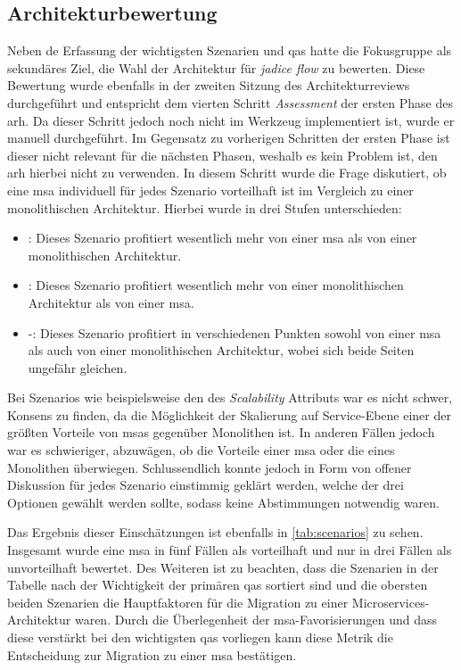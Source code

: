 \subsection{Architekturbewertung}

Neben de Erfassung der wichtigsten Szenarien und \glspl{qa} hatte die Fokusgruppe als sekundäres Ziel, die Wahl der Architektur für \emph{jadice flow} zu bewerten. 
Diese Bewertung wurde ebenfalls in der zweiten Sitzung des Architekturreviews durchgeführt und entspricht dem vierten Schritt \emph{Assessment} der ersten Phase des \gls{arh}.
Da dieser Schritt jedoch noch nicht im Werkzeug implementiert ist, wurde er manuell durchgeführt.
Im Gegensatz zu vorherigen Schritten der ersten Phase ist dieser nicht relevant für die nächsten Phasen, weshalb es kein Problem ist, den \gls{arh} hierbei nicht zu verwenden.
In diesem Schritt wurde die Frage diskutiert, ob eine \acrlong{msa} individuell für jedes Szenario vorteilhaft ist im Vergleich zu einer monolithischen Architektur.
Hierbei wurde in drei Stufen unterschieden:
\begin{itemize}
	\item \advantage\hspace*{0.1cm}: Dieses Szenario profitiert wesentlich mehr von einer \gls{msa} als von einer monolithischen Architektur.
	\item \disadvantage\hspace*{0.1cm}: Dieses Szenario profitiert wesentlich mehr von einer monolithischen Architektur als von einer \gls{msa}.
	\item \hspace*{0.27cm}-\hspace*{0.27cm}: Dieses Szenario profitiert in verschiedenen Punkten sowohl von einer \gls{msa} als auch von einer monolithischen Architektur, wobei sich beide Seiten ungefähr gleichen.
\end{itemize}
Bei Szenarios wie beispielsweise den des \emph{Scalability} Attributs war es nicht schwer, Konsens zu finden, da die Möglichkeit der Skalierung auf Service-Ebene einer der größten Vorteile von \glspl{msa} gegenüber Monolithen ist.
In anderen Fällen jedoch war es schwieriger, abzuwägen, ob die Vorteile einer \gls{msa} oder die eines Monolithen überwiegen.
Schlussendlich konnte jedoch in Form von offener  Diskussion für jedes Szenario einstimmig geklärt werden, welche der drei Optionen gewählt werden sollte, sodass keine Abstimmungen notwendig waren.

Das Ergebnis dieser Einschätzungen ist ebenfalls in \cref{tab:scenarios} zu sehen.
Insgesamt wurde eine \gls{msa} in fünf Fällen als vorteilhaft und nur in drei Fällen als unvorteilhaft bewertet. 
Des Weiteren ist zu beachten, dass die Szenarien in der Tabelle nach der Wichtigkeit der primären \glspl{qa} sortiert sind und die obersten beiden Szenarien die Hauptfaktoren für die Migration zu einer Microservices-Architektur waren.
Durch die Überlegenheit der \gls{msa}-Favorisierungen und dass diese verstärkt bei den wichtigsten \glspl{qa} vorliegen kann diese Metrik die Entscheidung zur Migration zu einer \gls{msa} bestätigen.

